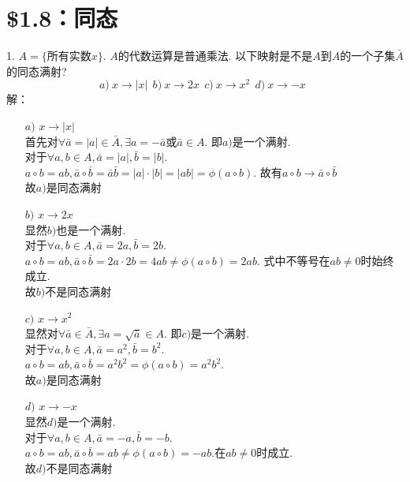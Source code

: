 \documentclass{ctexart}
\begin{document}
\section*{\$1.8：同态}
1. $A=\{ $所有实数$x\}$. $A$的代数运算是普通乘法. 以下映射是不是$A$到$A$的一个子集$\bar{A}$的同态满射? 
\begin{equation*}
	a)\  x \rightarrow |x| \ \ 
	b)\  x \rightarrow 2x  \ \ 
	c)\  x \rightarrow x^2 \ \ 
	d)\  x \rightarrow -x  \ \ 
\end{equation*}
解：\\ 
\begin{itemize}
	\item[$a)$] $x \rightarrow |x|$ \\
	首先对$\forall \bar{a} = |a| \in \bar{A}, \exists a = -\bar{a}$或$\bar{a}\in A$. 即$a)$是一个满射. \\
	对于$\forall a,b \in A, \bar{a} = |a|, \bar{b} = |b|$.\\ $a \circ b = ab, \bar{a} \circ \bar{b} = \bar{a}\bar{b} = |a| \cdot |b| = |ab| = \phi(a \circ b)$. 故有$a \circ b \rightarrow \bar{a} \circ \bar{b}$ \\
	故$a)$是同态满射
	\item[$b)$] $x \rightarrow 2x$ \\
	显然$b)$也是一个满射. \\
	对于$\forall a,b \in A, \bar{a} = 2a, \bar{b} = 2b$.\\ $a \circ b = ab, \bar{a} \circ \bar{b} = 2a \cdot 2b = 4ab \neq \phi(a \circ b)=2ab$. 式中不等号在$ab \neq 0$时始终成立. \\
	故$b)$不是同态满射	
	\item[$c)$] $x \rightarrow x^2$ \\
	显然对$\forall \bar{a} \in \bar{A}, \exists a = \sqrt{\bar{a}} \in A$. 即$c)$是一个满射. \\
	对于$\forall a,b \in A, \bar{a} = a^2, \bar{b} = b^2$.\\ $a \circ b = ab, \bar{a} \circ \bar{b} = a^2b^2 = \phi(a \circ b) = a^2b^2$. \\
	故$a)$是同态满射
	\item[$d)$] $x \rightarrow -x$  \\
	显然$d)$是一个满射. \\
	对于$\forall a,b \in A, \bar{a} = -a, \bar{b} = -b$.\\ $a \circ b = ab, \bar{a} \circ \bar{b} = ab \neq \phi(a \circ b) = -ab$.在$ab \neq 0$时成立. \\
	故$d)$不是同态满射
\end{itemize}
\end{document}
